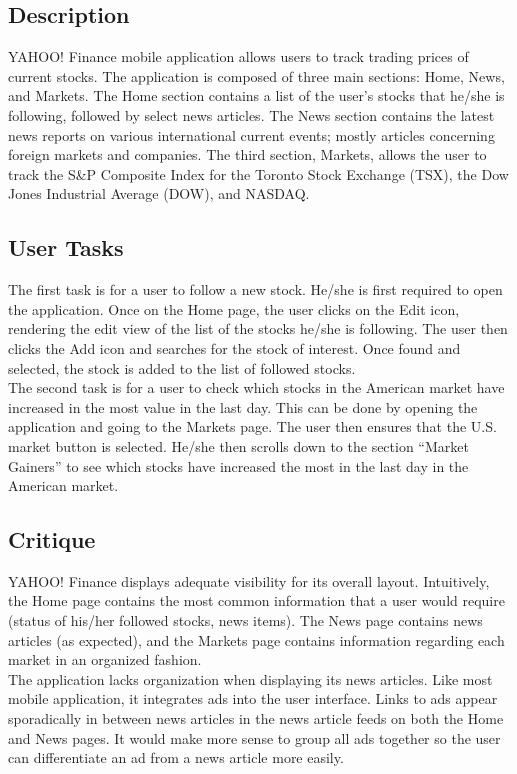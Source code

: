\documentclass{sigchi}
\begin{document}
\subsection{Description}
YAHOO! Finance mobile application allows users to track trading prices of current stocks. The application is composed of three main sections: Home, News, and Markets. The Home section contains a list of the user’s stocks that he/she is following, followed by select news articles. The News section contains the latest news reports on various international current events; mostly articles concerning foreign markets and companies. The third section, Markets, allows the user to track the S\&P Composite Index for the Toronto Stock Exchange (TSX), the Dow Jones Industrial Average (DOW), and NASDAQ. 

\subsection{User Tasks}
The first task is for a user to follow a new stock. He/she is first required to open the application. Once on the Home page, the user clicks on the Edit icon, rendering the edit view of the list of the stocks he/she is following. The user then clicks the Add icon and searches for the stock of interest. Once found and selected, the stock is added to the list of followed stocks.\\

The second task is for a user to check which stocks in the American market have increased in the most value in the last day. This can be done by opening the application and going to the Markets page. The user then ensures that the U.S. market button is selected. He/she then scrolls down to the section “Market Gainers” to see which stocks have increased the most in the last day in the American market.


\subsection{Critique}
YAHOO! Finance displays adequate visibility for its overall layout. Intuitively, the Home page contains the most common information that a user would require (status of his/her followed stocks, news items). The News page contains news articles (as expected), and the Markets page contains information regarding each market in an organized fashion. \\

The application lacks organization when displaying its news articles. Like most mobile application, it integrates ads into the user interface. Links to ads appear sporadically in between news articles in the news article feeds on both the Home and News pages. It would make more sense to group all ads together so the user can differentiate an ad from a news article more easily. 
\end{document}
